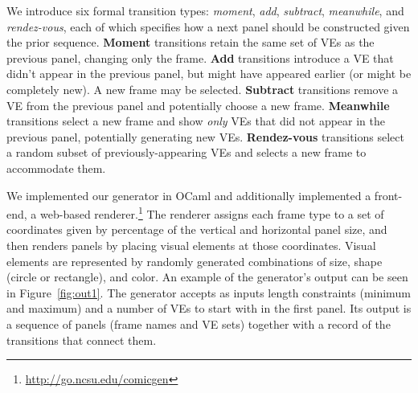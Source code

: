 
We introduce six formal transition types: {\em moment}, {\em add}, {\em
subtract}, {\em meanwhile}, and {\em rendez-vous}, each of which specifies
how a next panel should be constructed given the prior sequence.
{\bf Moment} transitions retain the same set of VEs as the previous panel, 
changing only the frame.
{\bf Add} transitions introduce a VE that didn't appear in the
previous panel, but might have appeared earlier (or might be completely
new). A new frame may be selected.
{\bf Subtract} transitions remove a VE from the previous panel and
potentially choose a new frame.
{\bf Meanwhile} transitions select a new frame and show {\em only}
VEs that did not appear in the previous panel, potentially generating new
VEs.
{\bf Rendez-vous} transitions select a random subset of
previously-appearing VEs 
and selects a new frame to accommodate them.


We implemented our generator in OCaml and additionally implemented a
front-end, a web-based renderer.\footnote{\url{http://go.ncsu.edu/comicgen}} The
renderer assigns each frame type to a set of coordinates given by
percentage of the vertical and horizontal panel size, and then renders
panels by placing visual elements at those coordinates. Visual elements are
represented by randomly generated combinations of size, shape (circle or
rectangle), and color.  An example of the generator's output can be seen in
Figure~\ref{fig:out1}. 
The generator accepts as inputs length constraints (minimum and maximum)
and a number of VEs to start with in the first panel. Its output is a
sequence of panels (frame names and VE sets) together with a record of the
transitions that connect them.


